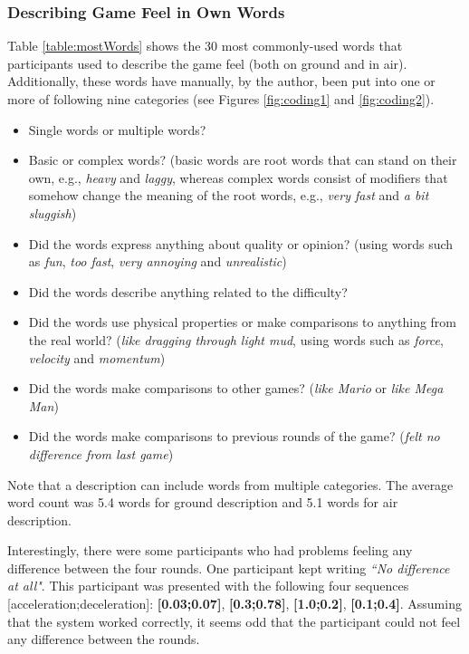 \subsubsection{Describing Game Feel in Own Words}
Table \ref{table:mostWords} shows the 30 most commonly-used words that participants used to describe the game feel (both on ground and in air). Additionally, these words have manually, by the author, been put into one or more of following nine categories (see Figures \ref{fig:coding1} and \ref{fig:coding2}).
\begin{itemize}[noitemsep,nolistsep]
\item Single words or multiple words?
\item Basic or complex words? (basic words are root words that can stand on their own, e.g., \textit{heavy} and \textit{laggy}, whereas complex words consist of modifiers that somehow change the meaning of the root words, e.g., \textit{very fast} and \textit{a bit sluggish})
\item Did the words express anything about quality or opinion? (using words such as \textit{fun}, \textit{too fast}, \textit{very annoying} and \textit{unrealistic})
\item Did the words describe anything related to the difficulty?
\item Did the words use physical properties or make comparisons to anything from the real world? (\textit{like dragging through light mud}, using words such as \textit{force}, \textit{velocity} and \textit{momentum})
\item Did the words make comparisons to other games? (\textit{like Mario} or \textit{like Mega Man})
\item Did the words make comparisons to previous rounds of the game? (\textit{felt no difference from last game})
\end{itemize}

Note that a description can include words from multiple categories. The average word count was 5.4 words for ground description and 5.1 words for air description.

Interestingly, there were some participants who had problems feeling any difference between the four rounds. One participant kept writing \textit{``No difference at all"}. This participant was presented with the following four sequences [acceleration;deceleration]: \textbf{[0.03;0.07]}, \textbf{[0.3;0.78]}, \textbf{[1.0;0.2]}, \textbf{[0.1;0.4]}. Assuming that the system worked correctly, it seems odd that the participant could not feel any difference between the rounds.

